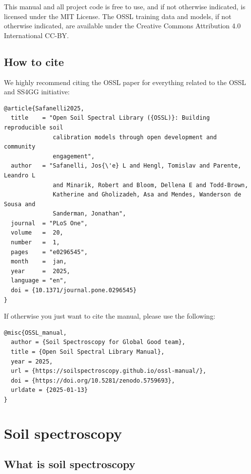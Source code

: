 \documentclass[
  letterpaper,
  DIV=11,
  numbers=noendperiod]{scrreprt}
\begin{document}
This manual and all project code is free to use, and if not otherwise
indicated, is licensed under the MIT License. The OSSL training data and
models, if not otherwise indicated, are available under the Creative
Commons Attribution 4.0 International CC-BY.

\section*{How to cite}\label{how-to-cite}


We highly recommend citing the OSSL paper for everything related to the
OSSL and SS4GG initiative:

\begin{verbatim}
@article{Safanelli2025,
  title    = "Open Soil Spectral Library ({OSSL)}: Building reproducible soil
              calibration models through open development and community
              engagement",
  author   = "Safanelli, Jos{\'e} L and Hengl, Tomislav and Parente, Leandro L
              and Minarik, Robert and Bloom, Dellena E and Todd-Brown,
              Katherine and Gholizadeh, Asa and Mendes, Wanderson de Sousa and
              Sanderman, Jonathan",
  journal  = "PLoS One",
  volume   =  20,
  number   =  1,
  pages    = "e0296545",
  month    =  jan,
  year     =  2025,
  language = "en",
  doi = {10.1371/journal.pone.0296545}
}
\end{verbatim}

If otherwise you just want to cite the manual, please use the following:

\begin{verbatim}
@misc{OSSL_manual,
  author = {Soil Spectroscopy for Global Good team},
  title = {Open Soil Spectral Library Manual},
  year = 2025,
  url = {https://soilspectroscopy.github.io/ossl-manual/},
  doi = {https://doi.org/10.5281/zenodo.5759693},
  urldate = {2025-01-13}
}
\end{verbatim}


\chapter{Soil spectroscopy}\label{sec-soilspec}

\section{What is soil spectroscopy}\label{what-is-soil-spectroscopy}
\end{document}
